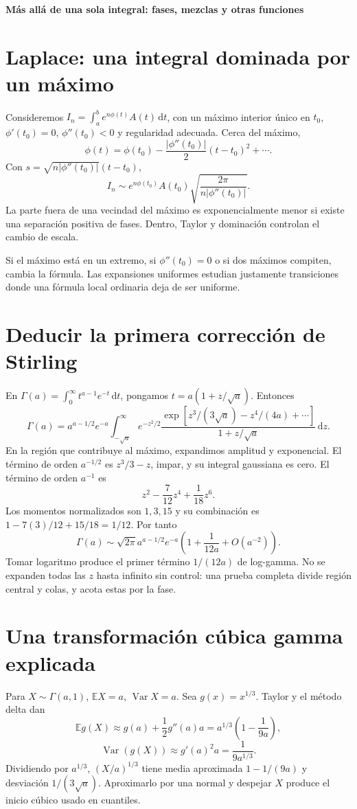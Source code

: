 \documentclass[11pt,a4paper]{article}
\newcommand{\E}{\mathbb E}
\newcommand{\dd}{\,\mathrm d}
\DeclareMathOperator{\Var}{Var}
\theoremstyle{definition}
\newcommand{\parte}[1]{\par\bigskip\Needspace{8\baselineskip}\begin{center}{\Large\bfseries\color{azul}#1}\end{center}}
\begin{document}
\parte{Más allá de una sola integral: fases, mezclas y otras funciones}
\section{Laplace: una integral dominada por un máximo}
Consideremos $I_n=\int_a^b e^{n\phi(t)}A(t)\dd t$, con un máximo interior único en $t_0$, $\phi'(t_0)=0$, $\phi''(t_0)<0$ y regularidad adecuada. Cerca del máximo,
\[
\phi(t)=\phi(t_0)-\frac{|\phi''(t_0)|}{2}(t-t_0)^2+\cdots.
\]
Con $s=\sqrt{n|\phi''(t_0)|}(t-t_0)$,
\[
I_n\sim e^{n\phi(t_0)}A(t_0)
\sqrt{\frac{2\pi}{n|\phi''(t_0)|}}.
\]
La parte fuera de una vecindad del máximo es exponencialmente menor si existe una separación positiva de fases. Dentro, Taylor y dominación controlan el cambio de escala.

Si el máximo está en un extremo, si $\phi''(t_0)=0$ o si dos máximos compiten, cambia la fórmula. Las expansiones uniformes estudian justamente transiciones donde una fórmula local ordinaria deja de ser uniforme.

\section{Deducir la primera corrección de Stirling}
En $\Gamma(a)=\int_0^\infty t^{a-1}e^{-t}\dd t$, pongamos $t=a(1+z/\sqrt a)$. Entonces
\[
\Gamma(a)=a^{a-1/2}e^{-a}\int_{-\sqrt a}^\infty
e^{-z^2/2}\frac{\exp[z^3/(3\sqrt a)-z^4/(4a)+\cdots]}
{1+z/\sqrt a}\dd z.
\]
En la región que contribuye al máximo, expandimos amplitud y exponencial. El término de orden $a^{-1/2}$ es $z^3/3-z$, impar, y su integral gaussiana es cero. El término de orden $a^{-1}$ es
\[
z^2-\frac7{12}z^4+\frac1{18}z^6.
\]
Los momentos normalizados son $1,3,15$ y su combinación es
$1-7(3)/12+15/18=1/12$. Por tanto
\[
\Gamma(a)\sim\sqrt{2\pi}a^{a-1/2}e^{-a}
\left(1+\frac1{12a}+O(a^{-2})\right).
\]
Tomar logaritmo produce el primer término $1/(12a)$ de log-gamma. No se expanden todas las $z$ hasta infinito sin control: una prueba completa divide región central y colas, y acota estas por la fase.

\section{Una transformación cúbica gamma explicada}
Para $X\sim\Gamma(a,1)$, $\E X=a$, $\Var X=a$. Sea $g(x)=x^{1/3}$. Taylor y el método delta dan
\[
\E g(X)\approx g(a)+\frac12g''(a)a
=a^{1/3}\left(1-\frac1{9a}\right),
\]
\[
\Var(g(X))\approx g'(a)^2a=\frac1{9a^{1/3}}.
\]
Dividiendo por $a^{1/3}$, $(X/a)^{1/3}$ tiene media aproximada $1-1/(9a)$ y desviación $1/(3\sqrt a)$. Aproximarlo por una normal y despejar $X$ produce el inicio cúbico usado en cuantiles.
\end{document}
